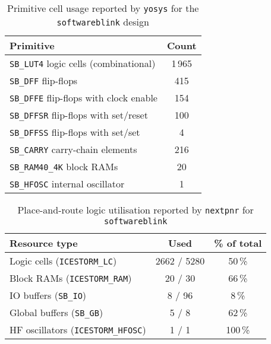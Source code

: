 \documentclass[a4paper,10pt]{article}
\begin{document}
\begin{table}[H]
    \centering
    \begin{tabular}{|l|c|}
        \hline
        \textbf{Primitive} & \textbf{Count} \\
        \hline
        \texttt{SB\_LUT4} logic cells (combinational) & 1\,965 \\
        \texttt{SB\_DFF} flip-flops & 415 \\
        \texttt{SB\_DFFE} flip-flops with clock enable & 154 \\
        \texttt{SB\_DFFSR} flip-flops with set/reset & 100 \\
        \texttt{SB\_DFFSS} flip-flops with set/set & 4 \\
        \texttt{SB\_CARRY} carry-chain elements & 216 \\
        \texttt{SB\_RAM40\_4K} block RAMs & 20 \\
        \texttt{SB\_HFOSC} internal oscillator & 1 \\
        \hline
    \end{tabular}
    \caption{Primitive cell usage reported by 
    \texttt{yosys} for the \texttt{softwareblink} design}
    \label{tab:software_yosys_report}
\end{table}

\begin{table}[H]
    \centering
    \begin{tabularx}{0.6\textwidth}{X c c}
        \toprule
        Resource type & Used & \% of total \\ \midrule
        Logic cells (\texttt{ICESTORM\_LC}) & 2662 / 5280 & 50\,\% \\
        Block RAMs (\texttt{ICESTORM\_RAM})& 20 / 30 & 66\,\% \\
        IO buffers (\texttt{SB\_IO}) & 8 / 96 & 8\,\% \\
        Global buffers (\texttt{SB\_GB}) & 5 / 8 & 62\,\% \\
        HF oscillators (\texttt{ICESTORM\_HFOSC}) & 1 / 1 & 100\,\% \\
        \bottomrule
    \end{tabularx}
    \caption{Place-and-route logic utilisation reported by 
    \texttt{nextpnr} for \texttt{softwareblink}}
    \label{tab:software_pnr_report}
\end{table}
\end{document}
